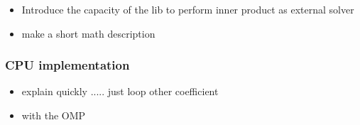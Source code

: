 \documentclass[oribibl]{llncs2e/llncs}
\begin{document}
\begin{itemize}
\item Introduce the capacity of the lib to perform inner product  as external solver
\item make a short math description 
\end{itemize}


\subsubsection{CPU implementation}
\begin{itemize}
\item   explain quickly ..... just loop other coefficient 
\item  with the OMP 
\end{itemize}
\end{document}
